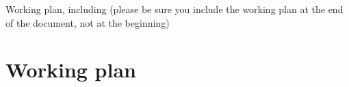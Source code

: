 
Working plan, including (please be sure you include the working plan at the end
of the document, not at the beginning)

\section{Working plan}%
\label{sec:working_plan}



